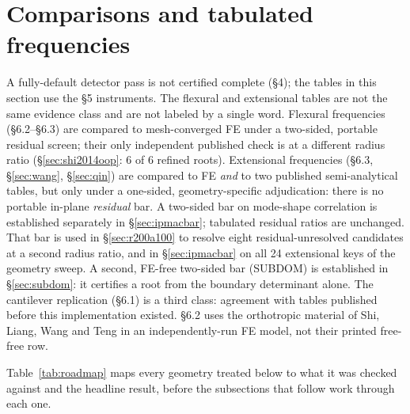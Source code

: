 \documentclass[11pt]{article}
\begin{document}
\section{Comparisons and tabulated frequencies}
A fully-default detector pass is not certified complete (\S4); the
tables in this section use the \S5 instruments. The flexural and
extensional tables are not the same evidence class and are not labeled
by a single word. Flexural frequencies
(\S6.2--\S6.3) are compared to mesh-converged FE under a two-sided,
portable residual screen; their only independent published check is
at a different radius ratio (\S\ref{sec:shi2014oop}: 6 of 6
refined roots). Extensional frequencies (\S6.3, \S\ref{sec:wang},
\S\ref{sec:qin}) are compared to FE \emph{and} to two published
semi-analytical tables, but only under a one-sided, geometry-specific
adjudication: there is no portable in-plane \emph{residual} bar. A
two-sided bar on mode-shape correlation is established separately in
\S\ref{sec:ipmacbar}; tabulated residual ratios are unchanged. That bar
is used in \S\ref{sec:r200a100} to resolve eight residual-unresolved
candidates at a second radius ratio, and in \S\ref{sec:ipmacbar} on all
24 extensional keys of the geometry sweep. A second, FE-free two-sided
bar (SUBDOM) is established in \S\ref{sec:subdom}: it certifies a root
from the boundary determinant alone. The cantilever
replication (\S6.1) is a third class: agreement with tables published
before this implementation existed. \S6.2 uses the orthotropic material
of Shi, Liang, Wang and Teng \cite{shi2016} in an independently-run FE model,
not their printed free-free row.

Table~\ref{tab:roadmap} maps every geometry treated below to what it was
checked against and the headline result, before the subsections that
follow work through each one.
\end{document}
